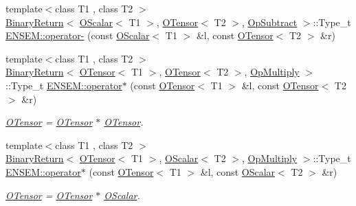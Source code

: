 \begin{DoxyCompactItemize}
\item 
{\footnotesize template$<$class T1 , class T2 $>$ }\\\mbox{\hyperlink{structENSEM_1_1BinaryReturn}{Binary\+Return}}$<$ \mbox{\hyperlink{classENSEM_1_1OScalar}{O\+Scalar}}$<$ T1 $>$, \mbox{\hyperlink{classENSEM_1_1OTensor}{O\+Tensor}}$<$ T2 $>$, \mbox{\hyperlink{structENSEM_1_1OpSubtract}{Op\+Subtract}} $>$\+::Type\+\_\+t \mbox{\hyperlink{group__obstensor_gadc53621528bc3dd8257b504bff4ec21e}{E\+N\+S\+E\+M\+::operator-\/}} (const \mbox{\hyperlink{classENSEM_1_1OScalar}{O\+Scalar}}$<$ T1 $>$ \&l, const \mbox{\hyperlink{classENSEM_1_1OTensor}{O\+Tensor}}$<$ T2 $>$ \&r)
\item 
{\footnotesize template$<$class T1 , class T2 $>$ }\\\mbox{\hyperlink{structENSEM_1_1BinaryReturn}{Binary\+Return}}$<$ \mbox{\hyperlink{classENSEM_1_1OTensor}{O\+Tensor}}$<$ T1 $>$, \mbox{\hyperlink{classENSEM_1_1OTensor}{O\+Tensor}}$<$ T2 $>$, \mbox{\hyperlink{structENSEM_1_1OpMultiply}{Op\+Multiply}} $>$\+::Type\+\_\+t \mbox{\hyperlink{group__obstensor_ga45559bd4234015a910a92c2eb80a69d5}{E\+N\+S\+E\+M\+::operator$\ast$}} (const \mbox{\hyperlink{classENSEM_1_1OTensor}{O\+Tensor}}$<$ T1 $>$ \&l, const \mbox{\hyperlink{classENSEM_1_1OTensor}{O\+Tensor}}$<$ T2 $>$ \&r)
\begin{DoxyCompactList}\small\item\em \mbox{\hyperlink{classENSEM_1_1OTensor}{O\+Tensor}} = \mbox{\hyperlink{classENSEM_1_1OTensor}{O\+Tensor}} $\ast$ \mbox{\hyperlink{classENSEM_1_1OTensor}{O\+Tensor}}. \end{DoxyCompactList}\item 
{\footnotesize template$<$class T1 , class T2 $>$ }\\\mbox{\hyperlink{structENSEM_1_1BinaryReturn}{Binary\+Return}}$<$ \mbox{\hyperlink{classENSEM_1_1OTensor}{O\+Tensor}}$<$ T1 $>$, \mbox{\hyperlink{classENSEM_1_1OScalar}{O\+Scalar}}$<$ T2 $>$, \mbox{\hyperlink{structENSEM_1_1OpMultiply}{Op\+Multiply}} $>$\+::Type\+\_\+t \mbox{\hyperlink{group__obstensor_gad60dc9814d8cddbdf21babfd0bff14c4}{E\+N\+S\+E\+M\+::operator$\ast$}} (const \mbox{\hyperlink{classENSEM_1_1OTensor}{O\+Tensor}}$<$ T1 $>$ \&l, const \mbox{\hyperlink{classENSEM_1_1OScalar}{O\+Scalar}}$<$ T2 $>$ \&r)
\begin{DoxyCompactList}\small\item\em \mbox{\hyperlink{classENSEM_1_1OTensor}{O\+Tensor}} = \mbox{\hyperlink{classENSEM_1_1OTensor}{O\+Tensor}} $\ast$ \mbox{\hyperlink{classENSEM_1_1OScalar}{O\+Scalar}}. \end{DoxyCompactList}\item 

\end{DoxyCompactItemize}
